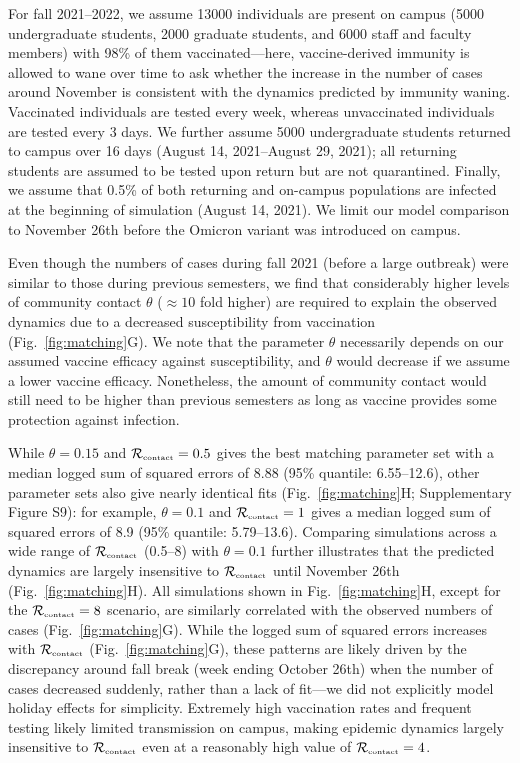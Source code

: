 \documentclass[12pt]{article}
\newcommand{\fref}[1]{Fig.~\ref{fig:#1}}
\newcommand{\Rx}[1]{\ensuremath{{\mathcal R}_{#1}}}
\newcommand{\Rc}{\Rx{\textrm{\tiny{contact}}}}
\begin{document}
For fall 2021--2022, we assume 13000 individuals are present on campus (5000 undergraduate students, 2000 graduate students, and 6000 staff and faculty members) with 98\% of them vaccinated---here, vaccine-derived immunity is allowed to wane over time to ask whether the increase in the number of cases around November is consistent with the dynamics predicted by immunity waning.
Vaccinated individuals are tested every week, whereas unvaccinated individuals are tested every 3 days. 
We further assume 5000 undergraduate students returned to campus over 16 days (August 14, 2021--August 29, 2021);
all returning students are assumed to be tested upon return but are not quarantined.
Finally, we assume that 0.5\% of both returning and on-campus populations are infected at the beginning of simulation (August 14, 2021).
We limit our model comparison to November 26th before the Omicron variant was introduced on campus.

Even though the numbers of cases during fall 2021 (before a large outbreak) were similar to those during previous semesters, we find that considerably higher levels of community contact $\theta$ ($\approx 10$ fold higher) are required to explain the observed dynamics due to a decreased susceptibility from vaccination (\fref{matching}G).
We note that the parameter $\theta$ necessarily depends on our assumed vaccine efficacy against susceptibility, and $\theta$ would decrease if we assume a lower vaccine efficacy.
Nonetheless, the amount of community contact would still need to be higher than previous semesters as long as vaccine provides some protection against infection.

While $\theta = 0.15$ and $\Rc = 0.5$ gives the best matching parameter set with a median logged sum of squared errors of 8.88 (95\% quantile: 6.55--12.6), other parameter sets also give nearly identical fits (\fref{matching}H; Supplementary Figure S9):
for example, $\theta = 0.1$ and $\Rc = 1$ gives a median logged sum of squared errors of 8.9 (95\% quantile: 5.79--13.6).
Comparing simulations across a wide range of $\Rc$ (0.5--8) with $\theta = 0.1$ further illustrates that the predicted dynamics are largely insensitive to $\Rc$ until November 26th (\fref{matching}H).
All simulations shown in \fref{matching}H, except for the $\Rc=8$ scenario, are similarly correlated with the observed numbers of cases (\fref{matching}G). 
While the logged sum of squared errors increases with $\Rc$ (\fref{matching}G), these patterns are likely driven by the discrepancy around fall break (week ending October 26th) when the number of cases decreased suddenly, rather than a lack of fit---we did not explicitly model holiday effects for simplicity.
Extremely high vaccination rates and frequent testing likely limited transmission on campus, making epidemic dynamics largely insensitive to $\Rc$ even at a reasonably high value of $\Rc = 4$.
\end{document}
